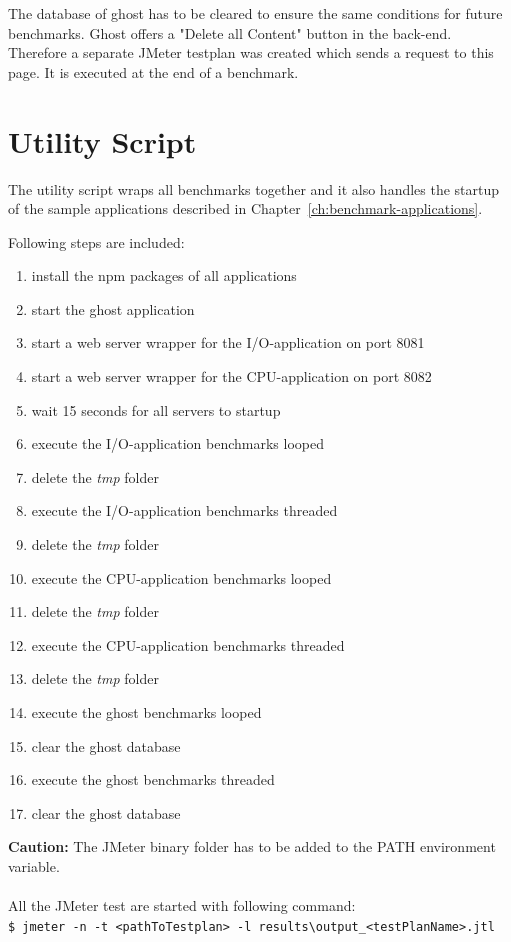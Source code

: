 	
	The database of ghost has to be cleared to ensure the same conditions for future benchmarks. Ghost offers a "Delete all Content" button in the back-end. Therefore a separate JMeter testplan was created which sends a request to this page. It is executed at the end of a benchmark.
\section{Utility Script}
\label{sec:utility-script}
The utility script wraps all benchmarks together and it also handles the startup of the sample applications described in Chapter~\ref{ch:benchmark-applications}.

Following steps are included:
\begin{enumerate}
	\item install the npm packages of all applications
	\item start the ghost application
	\item start a web server wrapper for the I/O-application on port 8081
	\item start a web server wrapper for the CPU-application on port 8082
	\item wait 15 seconds for all servers to startup
	\item execute the I/O-application benchmarks looped
	\item delete the \textit{tmp} folder
	\item execute the I/O-application benchmarks threaded
	\item delete the \textit{tmp} folder
	\item execute the CPU-application benchmarks looped
	\item delete the \textit{tmp} folder
	\item execute the CPU-application benchmarks threaded
	\item delete the \textit{tmp} folder
	\item execute the ghost benchmarks looped
	\item clear the ghost database
	\item execute the ghost benchmarks threaded
	\item clear the ghost database
\end{enumerate}

\textbf{Caution:} The JMeter binary folder has to be added to the PATH environment variable.\\ \\
All the JMeter test are started with following command:\\
\texttt{\$ jmeter -n -t <pathToTestplan> -l results\textbackslash output\_<testPlanName>.jtl}



